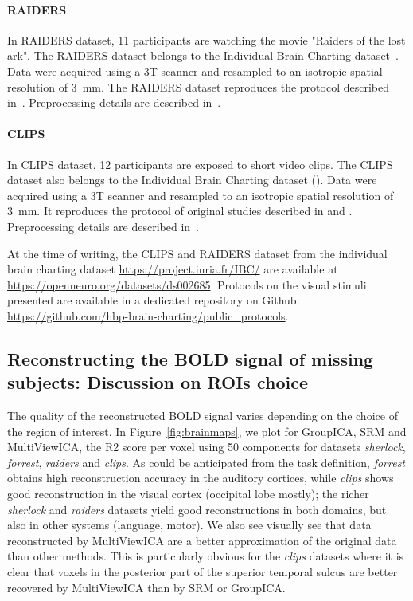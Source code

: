 \documentclass{report}
\begin{document}
{\paragraph{RAIDERS}
In RAIDERS dataset, 11 participants are watching the movie "Raiders of the lost ark".
% 
The RAIDERS dataset belongs to the Individual Brain Charting dataset~\cite{ibc}.
% 
Data were acquired using a 3T scanner and resampled to an isotropic spatial resolution of 3~mm.
% 
The RAIDERS dataset reproduces the protocol described in~\cite{haxby2011common}.
%
Preprocessing details are described in~\cite{ibc}.

\paragraph{CLIPS}
In CLIPS dataset, 12 participants are exposed to short video clips. 
%
The CLIPS dataset also belongs to the Individual Brain Charting dataset (\cite{ibc}).
%
Data were acquired using a 3T scanner and resampled to an isotropic spatial resolution of 3~mm.
%
It reproduces the protocol of original studies described in \cite{nishimoto2011reconstructing} and \cite{huth2012continuous}.
%
Preprocessing details are described in~\cite{ibc}.

At the time of writing, the CLIPS and RAIDERS dataset from the individual brain charting dataset \url{https://project.inria.fr/IBC/} are available at \url{https://openneuro.org/datasets/ds002685}.
%
Protocols on the visual stimuli presented are available in a dedicated repository on Github: \url{https://github.com/hbp-brain-charting/public_protocols}.

\subsection{Reconstructing the BOLD signal of missing subjects: Discussion on ROIs choice}
\label{brainmaps}

The quality of the reconstructed BOLD signal varies depending on the choice of the region of interest. In Figure~\ref{fig:brainmaps}, we plot for GroupICA, SRM and MultiViewICA, the R2 score per voxel using 50 components for datasets \emph{sherlock}, \emph{forrest}, \emph{raiders} and \emph{clips}. As could be anticipated from the task definition, \emph{forrest} obtains high reconstruction accuracy in the auditory cortices, while \emph{clips} shows good reconstruction in the visual cortex (occipital lobe mostly); the richer \emph{sherlock} and \emph{raiders} datasets yield good reconstructions in both domains, but also in other systems (language, motor).
%
We also see visually see that data reconstructed by MultiViewICA are
a better approximation of the original data than other methods.
%
This is particularly obvious for the \emph{clips} datasets where it is
clear that voxels in the posterior part of the superior
temporal sulcus are better recovered by MultiViewICA than by SRM or
GroupICA.

}
\end{document}
